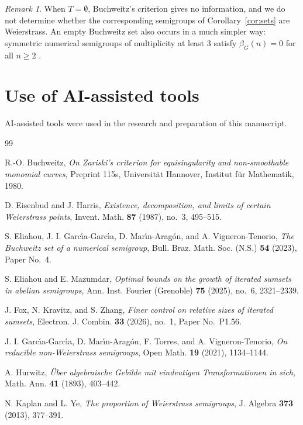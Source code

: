 \documentclass[11pt]{amsart}
\theoremstyle{definition}
\theoremstyle{remark}
\newtheorem{remark}[theorem]{Remark}
\numberwithin{equation}{section}
\begin{document}
\begin{remark}
When $T=\emptyset$, Buchweitz's criterion gives no information, and we do not determine whether the corresponding semigroups of Corollary~\ref{cor:sets} are Weierstrass. An empty Buchweitz set also occurs in a much simpler way: symmetric numerical semigroups of multiplicity at least $3$ satisfy $\beta_G(n)=0$ for all $n\ge 2$ \cite{Kom98, Oli91}.
\end{remark}

\section*{Use of AI-assisted tools}

AI-assisted tools were used in the research and preparation of this manuscript.

\begin{thebibliography}{99}

R.-O. Buchweitz, \emph{On Zariski's criterion for equisingularity and non-smoothable monomial curves}, Preprint 115s, Universit\"at Hannover, Institut f\"ur Mathematik, 1980.

D. Eisenbud and J. Harris, \emph{Existence, decomposition, and limits of certain Weierstrass points}, Invent. Math. \textbf{87} (1987), no.~3, 495--515.

S. Eliahou, J. I. Garc\'{\i}a-Garc\'{\i}a, D. Mar\'{\i}n-Arag\'on, and A. Vigneron-Tenorio, \emph{The Buchweitz set of a numerical semigroup}, Bull. Braz. Math. Soc. (N.S.) \textbf{54} (2023), Paper No.~4.

S. Eliahou and E. Mazumdar, \emph{Optimal bounds on the growth of iterated sumsets in abelian semigroups}, Ann. Inst. Fourier (Grenoble) \textbf{75} (2025), no.~6, 2321--2339.

J. Fox, N. Kravitz, and S. Zhang, \emph{Finer control on relative sizes of iterated sumsets}, Electron. J. Combin. \textbf{33} (2026), no.~1, Paper No.~P1.56.

J. I. Garc\'{\i}a-Garc\'{\i}a, D. Mar\'{\i}n-Arag\'on, F. Torres, and A. Vigneron-Tenorio, \emph{On reducible non-Weierstrass semigroups}, Open Math. \textbf{19} (2021), 1134--1144.

A. Hurwitz, \emph{\"Uber algebraische Gebilde mit eindeutigen Transformationen in sich}, Math. Ann. \textbf{41} (1893), 403--442.

N. Kaplan and L. Ye, \emph{The proportion of Weierstrass semigroups}, J. Algebra \textbf{373} (2013), 377--391.


\end{thebibliography}
\end{document}
